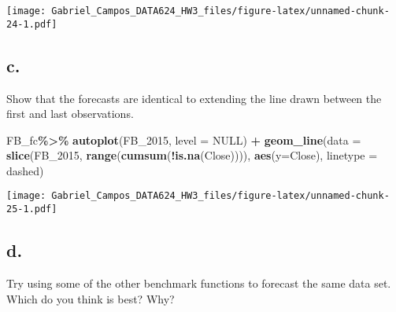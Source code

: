 \documentclass[
]{article}
\newenvironment{Shaded}{\begin{snugshade}}{\end{snugshade}}
\newcommand{\AttributeTok}[1]{\textcolor[rgb]{0.13,0.29,0.53}{#1}}
\newcommand{\ConstantTok}[1]{\textcolor[rgb]{0.56,0.35,0.01}{#1}}
\newcommand{\FunctionTok}[1]{\textcolor[rgb]{0.13,0.29,0.53}{\textbf{#1}}}
\newcommand{\NormalTok}[1]{#1}
\newcommand{\SpecialCharTok}[1]{\textcolor[rgb]{0.81,0.36,0.00}{\textbf{#1}}}
\newcommand{\StringTok}[1]{\textcolor[rgb]{0.31,0.60,0.02}{#1}}
\begin{document}
\texttt{[image: Gabriel\_Campos\_DATA624\_HW3\_files/figure-latex/unnamed-chunk-24-1.pdf]}

\hypertarget{c.}{%
\subsection{c.}\label{c.}}

Show that the forecasts are identical to extending the line drawn
between the first and last observations.

\begin{Shaded}
\begin{Highlighting}[]
\NormalTok{FB\_fc}\SpecialCharTok{\%\textgreater{}\%} 
  \FunctionTok{autoplot}\NormalTok{(FB\_2015, }\AttributeTok{level =} \ConstantTok{NULL}\NormalTok{) }\SpecialCharTok{+}
  \FunctionTok{geom\_line}\NormalTok{(}\AttributeTok{data =} \FunctionTok{slice}\NormalTok{(FB\_2015, }\FunctionTok{range}\NormalTok{(}\FunctionTok{cumsum}\NormalTok{(}\SpecialCharTok{!}\FunctionTok{is.na}\NormalTok{(Close)))),}
                         \FunctionTok{aes}\NormalTok{(}\AttributeTok{y=}\NormalTok{Close), }\AttributeTok{linetype =} \StringTok{\textquotesingle{}dashed\textquotesingle{}}\NormalTok{)}
\end{Highlighting}
\end{Shaded}

\texttt{[image: Gabriel\_Campos\_DATA624\_HW3\_files/figure-latex/unnamed-chunk-25-1.pdf]}

\hypertarget{d.}{%
\subsection{d.}\label{d.}}

Try using some of the other benchmark functions to forecast the same
data set. Which do you think is best? Why?
\end{document}
